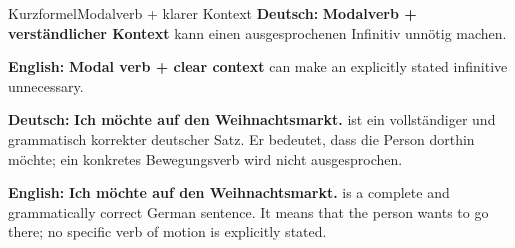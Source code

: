 \documentclass[a4paper,11pt]{article}
\newcommand{\GermanText}[1]{\textbf{Deutsch: }#1\par}
\newcommand{\EnglishText}[1]{{\small\color{SoftGray}\textbf{English: }#1\par}}
\begin{document}
        \begin{grammarentry}{Kurzformel}{Modalverb + klarer Kontext}
            \GermanText{\textbf{Modalverb + verständlicher Kontext} kann einen ausgesprochenen Infinitiv unnötig machen.}
            \EnglishText{\textbf{Modal verb + clear context} can make an explicitly stated infinitive unnecessary.}

            \GermanText{\textbf{Ich möchte auf den Weihnachtsmarkt.} ist ein vollständiger und grammatisch korrekter deutscher Satz. Er bedeutet, dass die Person dorthin möchte; ein konkretes Bewegungsverb wird nicht ausgesprochen.}
            \EnglishText{\textbf{Ich möchte auf den Weihnachtsmarkt.} is a complete and grammatically correct German sentence. It means that the person wants to go there; no specific verb of motion is explicitly stated.}
        \end{grammarentry}
\end{document}
